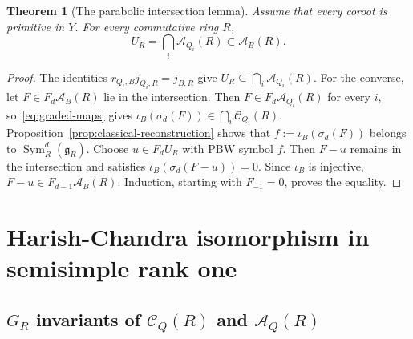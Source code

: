 \documentclass[twoside,a4paper,12pt,reqno]{amsart}
\newtheorem{theorem}{Theorem}[section]
\theoremstyle{remark}
\numberwithin{equation}{section}
\newcommand{\fg}{\mathfrak g}
\newcommand{\cA}{\mathcal A}
\DeclareMathOperator{\Sym}{Sym}
\begin{document}
\begin{theorem}[The parabolic intersection lemma]\label{thm:parabolic-reconstruction}
Assume that every coroot is primitive in \(Y\). For every commutative ring \(R\),
\[
U_R=\bigcap_i\cA_{Q_i}(R)\subset\cA_B(R).
\]
\end{theorem}
\begin{proof}
The identities \(r_{Q_i,B}j_{Q_i,R}=j_{B,R}\) give
\(U_R\subseteq\bigcap_i\cA_{Q_i}(R)\).
For the converse, let \(F\in F_d\cA_B(R)\) lie in the intersection.
Then \(F\in F_d\cA_{Q_i}(R)\) for every \(i\), so~\eqref{eq:graded-maps} gives
\(\iota_B(\sigma_d(F))\in\bigcap_i\mathcal C_{Q_i}(R)\).
Proposition~\ref{prop:classical-reconstruction} shows that
\(f:=\iota_B(\sigma_d(F))\) belongs to \(\Sym_R^d(\fg_R)\).
Choose \(u\in F_dU_R\) with PBW symbol \(f\). Then \(F-u\)
remains in the intersection and satisfies \(\iota_B(\sigma_d(F-u))=0\).
Since \(\iota_B\) is injective, \(F-u\in F_{d-1}\cA_B(R)\).
Induction, starting with \(F_{-1}=0\), proves the equality.
\end{proof}

\section{Harish-Chandra isomorphism in semisimple rank one}\label{sec:rankone}

\subsection{\texorpdfstring{\(G_R\) invariants of \(\mathcal C_Q(R)\) and \(\cA_Q(R)\)}{G\_R invariants of C\_Q(R) and A\_Q(R)}}
\end{document}
